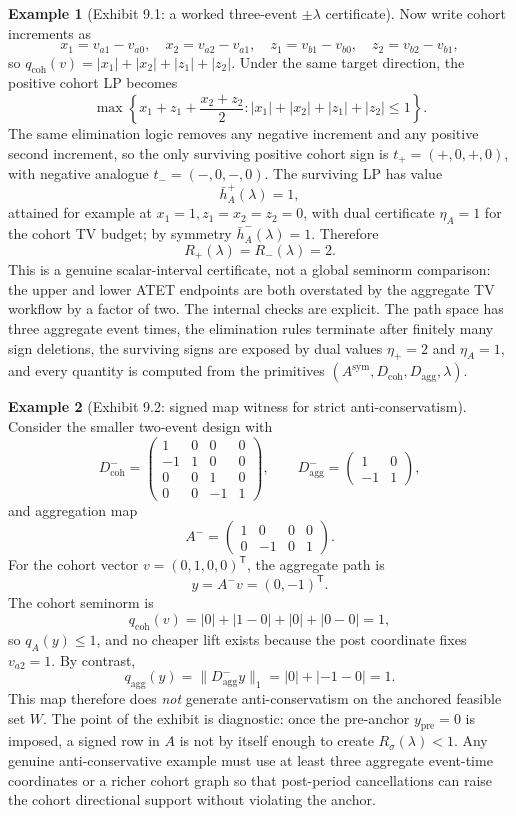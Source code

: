 \documentclass[11pt]{article}
\newcommand{\transpose}{\mathsf{T}}
\theoremstyle{definition}
\newtheorem{example}{Example}
\theoremstyle{plain}
\theoremstyle{remark}
\begin{document}
\begin{example}[Exhibit 9.1: a worked three-event \(\pm\lambda\) certificate]
Now write cohort increments as
\[
x_1=v_{a1}-v_{a0},\quad x_2=v_{a2}-v_{a1},\quad
z_1=v_{b1}-v_{b0},\quad z_2=v_{b2}-v_{b1},
\]
so \(q_{\mathrm{coh}}(v)=|x_1|+|x_2|+|z_1|+|z_2|\). Under the same target direction, the positive cohort LP becomes
\[
\max\left\{x_1+z_1+\frac{x_2+z_2}{2}:
|x_1|+|x_2|+|z_1|+|z_2|\le 1\right\}.
\]
The same elimination logic removes any negative increment and any positive second increment, so the only surviving positive cohort sign is \(t_+=(+,0,+,0)\), with negative analogue \(t_-=(-,0,-,0)\). The surviving LP has value
\[
\bar h_A^+(\lambda)=1,
\]
attained for example at \(x_1=1,z_1=x_2=z_2=0\), with dual certificate \(\eta_A=1\) for the cohort TV budget; by symmetry \(\bar h_A^-(\lambda)=1\). Therefore
\[
R_+(\lambda)=R_-(\lambda)=2.
\]
This is a genuine scalar-interval certificate, not a global seminorm comparison: the upper and lower ATET endpoints are both overstated by the aggregate TV workflow by a factor of two. The internal checks are explicit. The path space has three aggregate event times, the elimination rules terminate after finitely many sign deletions, the surviving signs are exposed by dual values \(\eta_+=2\) and \(\eta_A=1\), and every quantity is computed from the primitives \((A^{\mathrm{sym}},D_{\mathrm{coh}},D_{\mathrm{agg}},\lambda)\).
\end{example}

\begin{example}[Exhibit 9.2: signed map witness for strict anti-conservatism]\label{ex:anti}
Consider the smaller two-event design with
\[
D_{\mathrm{coh}}^{-}
=
\begin{pmatrix}
1&0&0&0\\
-1&1&0&0\\
0&0&1&0\\
0&0&-1&1
\end{pmatrix},
\qquad
D_{\mathrm{agg}}^{-}
=
\begin{pmatrix}
1&0\\
-1&1
\end{pmatrix},
\]
and aggregation map
\[
A^{-}=
\begin{pmatrix}
1&0&0&0\\
0&-1&0&1
\end{pmatrix}.
\]
For the cohort vector \(v=(0,1,0,0)^\transpose\), the aggregate path is
\[
y=A^{-}v=(0,-1)^\transpose.
\]
The cohort seminorm is
\[
q_{\mathrm{coh}}(v)=|0|+|1-0|+|0|+|0-0|=1,
\]
so \(q_A(y)\le 1\), and no cheaper lift exists because the post coordinate fixes \(v_{a2}=1\). By contrast,
\[
q_{\mathrm{agg}}(y)=\|D_{\mathrm{agg}}^{-}y\|_1=|0|+|-1-0|=1.
\]
This map therefore does \emph{not} generate anti-conservatism on the anchored feasible set \(W\). The point of the exhibit is diagnostic: once the pre-anchor \(y_{\mathrm{pre}}=0\) is imposed, a signed row in \(A\) is not by itself enough to create \(R_\sigma(\lambda)<1\). Any genuine anti-conservative example must use at least three aggregate event-time coordinates or a richer cohort graph so that post-period cancellations can raise the cohort directional support without violating the anchor.
\end{example}
\end{document}
